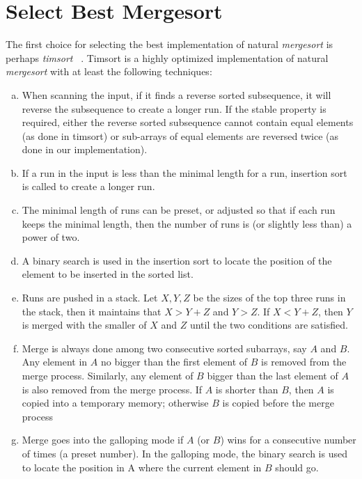 \documentclass[AMA,STIX1COL]{WileyNJD-v2}
\newcommand{\tsort}{\emph{timsort }}
\newcommand{\msort}{\emph{mergesort }}
\begin{document}
\section{Select Best Mergesort}        
The first choice for selecting the best implementation of natural \msort is perhaps \tsort~\cite{timsort}. Timsort is a highly optimized implementation of natural \msort with at least the following techniques:
\begin{enumerate}[(a)]
\item When scanning the input, if it finds a reverse sorted subsequence, it will reverse the subsequence to create a longer run. If the stable property is required, either the reverse sorted subsequence cannot contain equal elements (as done in timsort) or sub-arrays of equal elements are reversed twice (as done in our implementation).
\item If a run in the input is less than the minimal length for a run, insertion sort is called to create a longer run. 
\item The minimal length of runs can be preset, or adjusted so that if each run keeps the minimal length, then the number of runs is (or slightly less than) a power of two.
\item A binary search is used in the insertion sort to locate the position of the element to be inserted in the sorted list.
\item Runs are pushed in a stack. Let $X, Y, Z$ be the sizes of the top three runs in the stack, then it maintains that $X > Y+Z$ and $Y > Z$.  
If $X < Y+Z$, then $Y$ is merged with the smaller of $X$ and $Z$ until the two conditions are satisfied. 
\item Merge is always done among two consecutive sorted subarrays, say $A$ and $B$. 
Any element in $A$ no bigger than the first element of $B$ is removed from the merge process. 
Similarly, any element of $B$ bigger than the last element of $A$ is also removed from the merge process. 
If $A$ is shorter than $B$, then $A$ is copied into a temporary memory; otherwise $B$ is copied before the merge process
\item Merge goes into the galloping mode if $A$ (or $B$) wins for a consecutive number of times (a preset number). 
In the galloping mode, the binary search is used to locate the position in A where the current element in $B$ should go.
\end{enumerate}
\end{document}
